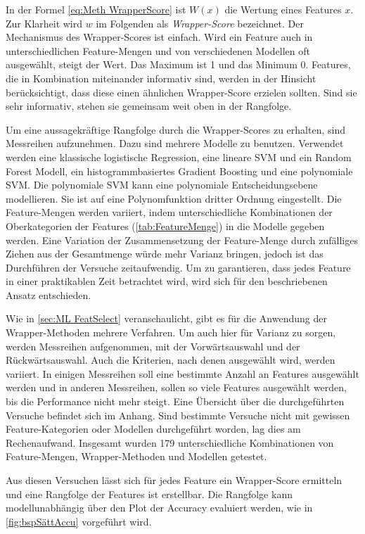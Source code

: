 In der Formel \ref{eq:Meth WrapperScore} ist \(W(x)\) die Wertung eines Features \(x\). Zur Klarheit wird \(w\) im Folgenden als \textit{Wrapper-Score} bezeichnet. Der Mechanismus des Wrapper-Scores ist einfach. Wird ein Feature auch in unterschiedlichen Feature-Mengen und von verschiedenen Modellen oft ausgewählt, steigt der Wert. Das Maximum ist 1 und das Minimum 0. Features, die in Kombination miteinander informativ sind, werden in der Hinsicht berücksichtigt, dass diese einen ähnlichen Wrapper-Score erzielen sollten. Sind sie sehr informativ, stehen sie gemeinsam weit oben in der Rangfolge. \par

Um eine aussagekräftige Rangfolge durch die Wrapper-Scores zu erhalten, sind Messreihen aufzunehmen. Dazu sind mehrere Modelle zu benutzen. Verwendet werden eine klassische logistische Regression, eine lineare SVM und ein Random Forest Modell, ein histogrammbasiertes Gradient Boosting und eine polynomiale SVM. Die polynomiale SVM kann eine polynomiale Entscheidungsebene modellieren. Sie ist auf eine Polynomfunktion dritter Ordnung eingestellt. Die Feature-Mengen werden variiert, indem unterschiedliche Kombinationen der Oberkategorien der Features (\autoref{tab:FeatureMenge}) in die Modelle gegeben werden. Eine Variation der Zusammensetzung der Feature-Menge durch zufälliges Ziehen aus der Gesamtmenge würde mehr Varianz bringen, jedoch ist das Durchführen der Versuche zeitaufwendig. Um zu garantieren, dass jedes Feature in einer praktikablen Zeit betrachtet wird, wird sich für den beschriebenen Ansatz entschieden.\par

Wie in \autoref{sec:ML FeatSelect} veranschaulicht, gibt es für die Anwendung der Wrapper-Methoden mehrere Verfahren. Um auch hier für Varianz zu sorgen, werden Messreihen aufgenommen, mit der Vorwärtsauswahl und der Rückwärtsauswahl. Auch die Kriterien, nach denen ausgewählt wird, werden variiert. In einigen Messreihen soll eine bestimmte Anzahl an Features ausgewählt werden und in anderen Messreihen, sollen so viele Features ausgewählt werden, bis die Performance nicht mehr steigt. Eine Übersicht über die durchgeführten Versuche befindet sich im Anhang. Sind bestimmte Versuche nicht mit gewissen Feature-Kategorien oder Modellen durchgeführt worden, lag dies am Rechenaufwand. Insgesamt wurden 179 unterschiedliche Kombinationen von Feature-Mengen, Wrapper-Methoden und Modellen getestet. \par

Aus diesen Versuchen lässt sich für jedes Feature ein Wrapper-Score ermitteln und eine Rangfolge der Features ist erstellbar. Die Rangfolge kann modellunabhängig über den Plot der Accuracy evaluiert werden, wie in \autoref{fig:bspSättAccu} vorgeführt wird. \par

